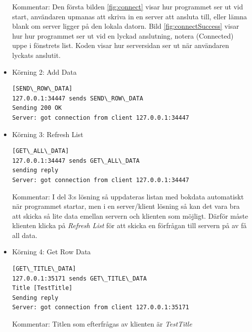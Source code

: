 \documentclass[11pt, titlepage, oneside, a4paper]{article}
\begin{document}
\begin{itemize}
Kommentar: Den första bilden \ref{fig:connect} visar hur programmet ser ut vid start, användaren upmanas att skriva in en server att ansluta till, eller lämna blank om server
ligger på den lokala datorn. Bild \ref{fig:connectSuccess} visar hur hur programmet ser ut vid en lyckad anslutning, notera (Connected) uppe i fönstrets list.
Koden visar hur serversidan ser ut när användaren lyckats anslutit.

    \item Körning 2: Add Data
    \subitem \begin{lstlisting}
[SEND\_ROW\_DATA]
127.0.0.1:34447 sends SEND\_ROW\_DATA
Sending 200 OK
Server: got connection from client 127.0.0.1:34447
             \end{lstlisting}
		 \item Körning 3: Refresh List

    \begin{lstlisting}
[GET\_ALL\_DATA]
127.0.0.1:34447 sends GET\_ALL\_DATA
sending reply
Server: got connection from client 127.0.0.1:34447
             \end{lstlisting}

Kommentar: I del 3:s lösning så uppdateras listan med bokdata automatiskt när programmet startar, men i en server/klient lösning så kan det vara bra att skicka så lite
data emellan servern och klienten som möjligt. Därför måste klienten klicka på \emph{Refresh List} för att skicka en förfrågan till servern på av få all data.
	
			 \item Körning 4: Get Row Data

    \begin{lstlisting}
[GET\_TITLE\_DATA]
127.0.0.1:35171 sends GET\_TITLE\_DATA
Title [TestTitle]
Sending reply
Server: got connection from client 127.0.0.1:35171
             \end{lstlisting}
             
Kommentar: Titlen som efterfrågas av klienten är \emph{TestTitle}
\end{itemize}
\end{document}
